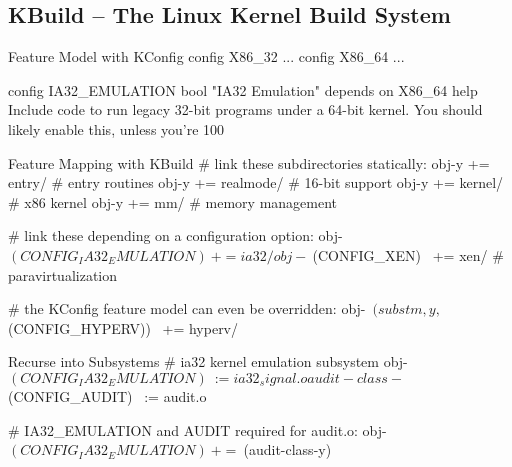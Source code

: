 \subsection{KBuild -- The Linux Kernel Build System}
\begin{frame}[fragile]{\myframetitle}
	\begin{mycolumns}
		\begin{kconfigtight}[basicstyle=\footnotesize]{Feature Model with KConfig}
config X86_32 ...
config X86_64 ...

config IA32_EMULATION
	bool "IA32 Emulation"
	depends on X86_64
	help Include code to run legacy 32-bit programs under a 64-bit kernel. You should likely enable this, unless you're 100%
\end{kconfigtight}
	\mynextcolumn
		\begin{kbuildtight}[basicstyle=\small]{Feature Mapping with KBuild }
# link these subdirectories statically:
obj-y += entry/ # entry routines
obj-y += realmode/ # 16-bit support
obj-y += kernel/ # x86 kernel
obj-y += mm/ # memory management

# link these depending on a configuration option:
obj-~$(CONFIG_IA32_EMULATION)~ += ia32/
obj-~$(CONFIG_XEN)~ += xen/ # paravirtualization

# the KConfig feature model can even be overridden:
obj-~$(subst m,y,$(CONFIG_HYPERV))~ += hyperv/
		\end{kbuildtight}

		\begin{kbuildtight}[basicstyle=\small]{Recurse into Subsystems}
# ia32 kernel emulation subsystem
obj-~$(CONFIG_IA32_EMULATION)~ := ia32_signal.o
audit-class-~$(CONFIG_AUDIT)~ := audit.o

# IA32_EMULATION and AUDIT required for audit.o:
obj-~$(CONFIG_IA32_EMULATION)~ += ~$(audit-class-y)~
		\end{kbuildtight}
	\end{mycolumns}
\end{frame}


